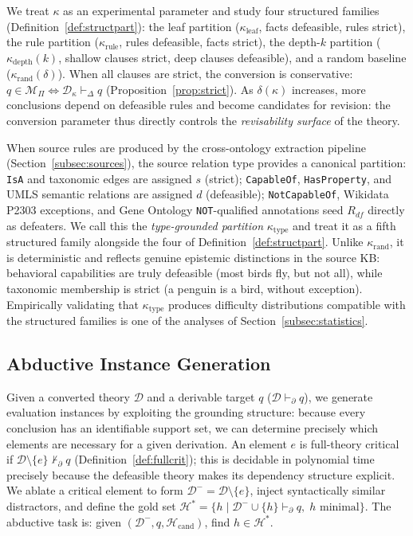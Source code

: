 \documentclass{article}
\theoremstyle{definition}
\newcommand{\D}{\mathcal{D}}
\newcommand{\Dm}{\mathcal{D}^{-}}
\newcommand{\Hcand}{\mathcal{H}_{\mathrm{cand}}}
\newcommand{\Hgold}{\mathcal{H}^{*}}
\newcommand{\Rdf}{R_{df}}
\newcommand{\partfunc}{\kappa}
\newcommand{\pDelta}{\vdash_{\Delta}}
\newcommand{\pPartial}{\vdash_{\partial}}
\begin{document}
We treat $\partfunc$ as an experimental parameter and study four structured families (Definition~\ref{def:structpart}): the leaf partition ($\partfunc_{\mathrm{leaf}}$, facts defeasible, rules strict), the rule partition ($\partfunc_{\mathrm{rule}}$, rules defeasible, facts strict), the depth-$k$ partition ($\partfunc_{\mathrm{depth}}(k)$, shallow clauses strict, deep clauses defeasible), and a random baseline ($\partfunc_{\mathrm{rand}}(\delta)$). When all clauses are strict, the conversion is conservative: $q \in \mathcal{M}_\Pi \iff \D_\partfunc \pDelta q$ (Proposition~\ref{prop:strict}). As $\delta(\partfunc)$ increases, more conclusions depend on defeasible rules and become candidates for revision: the conversion parameter thus directly controls the \emph{revisability surface} of the theory.

When source rules are produced by the cross-ontology extraction pipeline (Section~\ref{subsec:sources}), the source relation type provides a canonical partition: \texttt{IsA} and taxonomic edges are assigned $s$ (strict); \texttt{CapableOf}, \texttt{HasProperty}, and UMLS semantic relations are assigned $d$ (defeasible); \texttt{NotCapableOf}, Wikidata P2303 exceptions, and Gene Ontology \texttt{NOT}-qualified annotations seed $\Rdf$ directly as defeaters. We call this the \emph{type-grounded partition} $\partfunc_{\mathrm{type}}$ and treat it as a fifth structured family alongside the four of Definition~\ref{def:structpart}. Unlike $\partfunc_{\mathrm{rand}}$, it is deterministic and reflects genuine epistemic distinctions in the source KB: behavioral capabilities are truly defeasible (most birds fly, but not all), while taxonomic membership is strict (a penguin is a bird, without exception). Empirically validating that $\partfunc_{\mathrm{type}}$ produces difficulty distributions compatible with the structured families is one of the analyses of Section~\ref{subsec:statistics}.

\subsection{Abductive Instance Generation}\label{subsec:abduction}

Given a converted theory $\D$ and a derivable target $q$ ($\D \pPartial q$), we generate evaluation instances by exploiting the grounding structure: because every conclusion has an identifiable support set, we can determine precisely which elements are necessary for a given derivation. An element $e$ is full-theory critical if $\D \setminus \{e\} \not\pPartial q$ (Definition~\ref{def:fullcrit}); this is decidable in polynomial time precisely because the defeasible theory makes its dependency structure explicit. We ablate a critical element to form $\Dm = \D \setminus \{e\}$, inject syntactically similar distractors, and define the gold set $\Hgold = \{h \mid \Dm \cup \{h\} \pPartial q,\; h \text{ minimal}\}$. The abductive task is: given $(\Dm, q, \Hcand)$, find $h \in \Hgold$.
\end{document}
